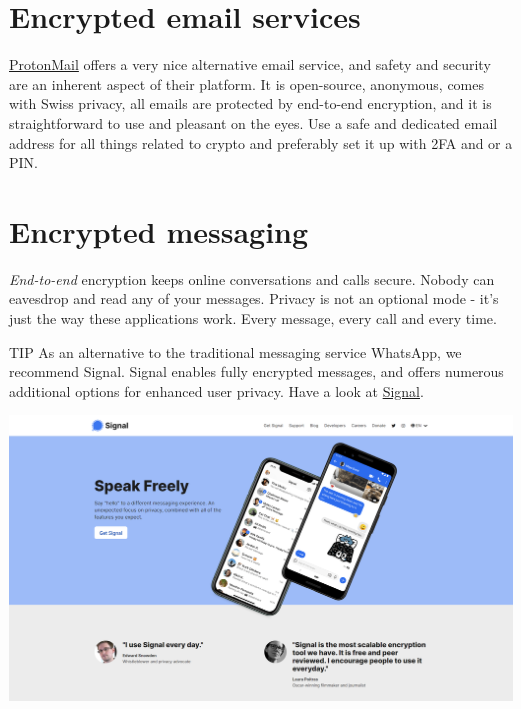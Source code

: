 \section{Encrypted email services}
\href{https://protonmail.com/}{ProtonMail} offers a very nice alternative email service, and safety and security are an inherent aspect of their platform. It is open-source, anonymous, comes with Swiss privacy, all emails are protected by end-to-end encryption, and it is straightforward to use and pleasant on the eyes. Use a safe and dedicated email address for all things related to crypto and preferably set it up with 2FA and or a PIN.

\section{Encrypted messaging}
\emph{End-to-end} encryption keeps online conversations and calls secure. Nobody can eavesdrop and read any of your messages. Privacy is not an optional mode - it's just the way these applications work. Every message, every call and every time.\medskip

    \begin{tipbox}{TIP}
            As an alternative to the traditional messaging service WhatsApp, we recommend Signal. Signal enables fully encrypted messages, and offers numerous additional options for enhanced user privacy.
        \tcblower
        Have a look at \href{https://signal.org/}{Signal}.
    \end{tipbox}\medskip

\begin{borderbox}
\includegraphics[width=\textwidth]{img/ch-privacy/signal.png}
\end{borderbox}


